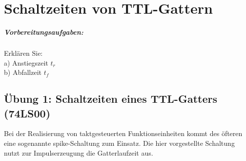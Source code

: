 \documentclass[11pt,a4paper,titlepage,parskip=half]{scrreprt}
\begin{document}
        
             
  \chapter{Schaltzeiten von TTL-Gattern}
    \paragraph{Vorbereitungsaufgaben:} Erklären Sie:\\a) Anstiegszeit \textbf{$t_r$}\\b) Abfallzeit \textbf{$t_f$}

    
    \section{Übung 1: Schaltzeiten eines TTL-Gatters (74LS00)}
      Bei der Realisierung von taktgesteuerten Funktionseinheiten kommt des öfteren eine sogenannte spike-Schaltung zum Einsatz. Die hier vorgestellte Schaltung nutzt zur Impulserzeugung die Gatterlaufzeit aus.
      
\end{document}
